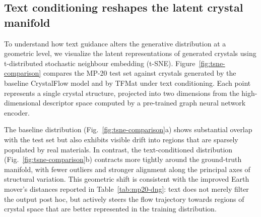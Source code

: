\documentclass[fleqn,10pt]{wlscirep}
\begin{document}
\begin{table}[ht]
\centering
\small
\setlength{\tabcolsep}{4pt}
\caption{\textbf{Targeted TFMat hyperparameter search on MP-20 (best in bold; second-best underlined).} Metrics are extracted from the four evaluation logs provided in the prompt. The \texttt{auto} setting denotes the default guided-sampling configuration used by the evaluation pipeline. Configuration 3 (100 ODE steps, anneal slope 10, auto guidance) achieves the best overall balance across validity and distributional metrics.}
\label{tab:mp20-dng-hparam}
\end{table}

\subsection*{Text conditioning reshapes the latent crystal manifold}
To understand how text guidance alters the generative distribution at a geometric level, we visualize the latent representations of generated crystals using t-distributed stochastic neighbour embedding (t-SNE). Figure~\ref{fig:tsne-comparison} compares the MP-20 test set against crystals generated by the baseline CrystalFlow model and by TFMat under text conditioning. Each point represents a single crystal structure, projected into two dimensions from the high-dimensional descriptor space computed by a pre-trained graph neural network encoder.

The baseline distribution (Fig.~\ref{fig:tsne-comparison}a) shows substantial overlap with the test set but also exhibits visible drift into regions that are sparsely populated by real materials. In contrast, the text-conditioned distribution (Fig.~\ref{fig:tsne-comparison}b) contracts more tightly around the ground-truth manifold, with fewer outliers and stronger alignment along the principal axes of structural variation. This geometric shift is consistent with the improved Earth mover's distances reported in Table~\ref{tab:mp20-dng}: text does not merely filter the output post hoc, but actively steers the flow trajectory towards regions of crystal space that are better represented in the training distribution.
\end{document}
